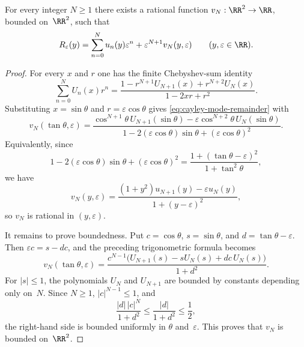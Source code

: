\begin{proposition}%
\label{prop:cayley-mode-remainder}
For every integer $N\ge 1$ there exists a rational function
$v_N:\RR^2\to\RR$, bounded on~$\RR^2$, such that
\begin{equation}\label{eq:cayley-mode-remainder}
R_\varepsilon(y)
=\sum_{n=0}^{N}u_n(y)\varepsilon^n+\varepsilon^{N+1}v_N(y,\varepsilon)
\qquad(y,\varepsilon\in\RR).
\end{equation}
\end{proposition}

\begin{proof}
For every $x$ and $r$ one has the finite Chebyshev-sum identity
\[
\sum_{n=0}^{N}U_n(x)r^n
=\frac{1-r^{N+1}U_{N+1}(x)+r^{N+2}U_N(x)}{1-2xr+r^2}.
\]
\cite[Chapter~5]{MasonHandscomb2002}
Substituting $x=\sin\theta$ and $r=\varepsilon\cos\theta$ gives
\eqref{eq:cayley-mode-remainder} with
\[
v_N(\tan\theta,\varepsilon)
=\frac{\cos^{N+1}\theta\,U_{N+1}(\sin\theta)
-\varepsilon\cos^{N+2}\theta\,U_N(\sin\theta)}
{1-2(\varepsilon\cos\theta)\sin\theta+(\varepsilon\cos\theta)^2}.
\]
Equivalently, since
\[
1-2(\varepsilon\cos\theta)\sin\theta
   +(\varepsilon\cos\theta)^2
=\frac{1+(\tan\theta-\varepsilon)^2}{1+\tan^2\theta},
\]
we have
\[
v_N(y,\varepsilon)
=\frac{(1+y^2)u_{N+1}(y)-\varepsilon u_N(y)}
       {1+(y-\varepsilon)^2},
\]
so $v_N$ is rational in $(y,\varepsilon)$.

It remains to prove boundedness.  Put
$c=\cos\theta$, $s=\sin\theta$, and $d=\tan\theta-\varepsilon$.  Then
$\varepsilon c=s-dc$, and the preceding trigonometric formula becomes
\[
v_N(\tan\theta,\varepsilon)
=\frac{c^{N-1}\bigl(U_{N+1}(s)-sU_N(s)+dc\,U_N(s)\bigr)}
       {1+d^2}.
\]
For $|s|\le1$, the polynomials $U_N$ and $U_{N+1}$ are bounded by
constants depending only on~$N$.  Since $N\ge1$, $|c|^{N-1}\le1$, and
\[
\frac{|d|\,|c|^N}{1+d^2}\le \frac{|d|}{1+d^2}\le \frac12,
\]
the right-hand side is bounded uniformly in $\theta$ and~$\varepsilon$.
This proves that $v_N$ is bounded on~$\RR^2$.
\end{proof}

